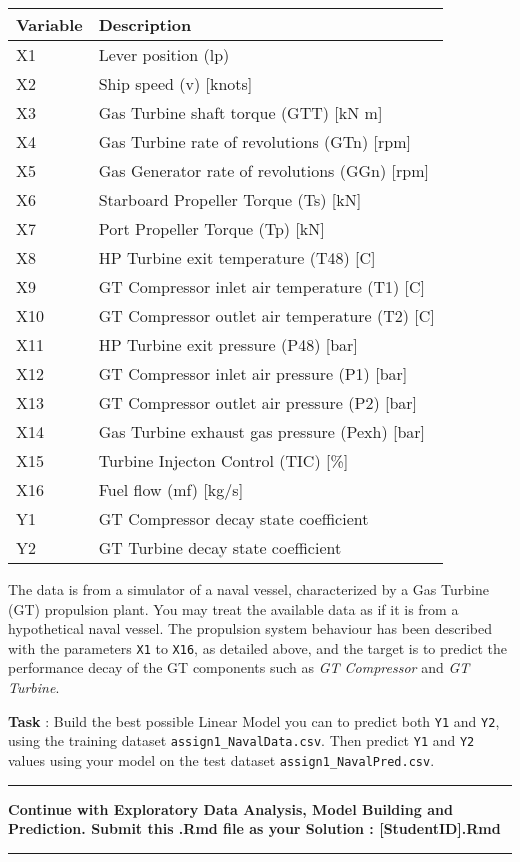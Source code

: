 \documentclass[
]{article}
\begin{document}
\begin{longtable}[]{@{}ll@{}}
\toprule
Variable & Description\tabularnewline
\midrule
\endhead
X1 & Lever position (lp)\tabularnewline
X2 & Ship speed (v) {[}knots{]}\tabularnewline
X3 & Gas Turbine shaft torque (GTT) {[}kN m{]}\tabularnewline
X4 & Gas Turbine rate of revolutions (GTn) {[}rpm{]}\tabularnewline
X5 & Gas Generator rate of revolutions (GGn) {[}rpm{]}\tabularnewline
X6 & Starboard Propeller Torque (Ts) {[}kN{]}\tabularnewline
X7 & Port Propeller Torque (Tp) {[}kN{]}\tabularnewline
X8 & HP Turbine exit temperature (T48) {[}C{]}\tabularnewline
X9 & GT Compressor inlet air temperature (T1) {[}C{]}\tabularnewline
X10 & GT Compressor outlet air temperature (T2) {[}C{]}\tabularnewline
X11 & HP Turbine exit pressure (P48) {[}bar{]}\tabularnewline
X12 & GT Compressor inlet air pressure (P1) {[}bar{]}\tabularnewline
X13 & GT Compressor outlet air pressure (P2) {[}bar{]}\tabularnewline
X14 & Gas Turbine exhaust gas pressure (Pexh) {[}bar{]}\tabularnewline
X15 & Turbine Injecton Control (TIC) {[}\%{]}\tabularnewline
X16 & Fuel flow (mf) {[}kg/s{]}\tabularnewline
Y1 & GT Compressor decay state coefficient\tabularnewline
Y2 & GT Turbine decay state coefficient\tabularnewline
\bottomrule
\end{longtable}

The data is from a simulator of a naval vessel, characterized by a Gas
Turbine (GT) propulsion plant. You may treat the available data as if it
is from a hypothetical naval vessel. The propulsion system behaviour has
been described with the parameters \texttt{X1} to \texttt{X16}, as
detailed above, and the target is to predict the performance decay of
the GT components such as \emph{GT Compressor} and \emph{GT Turbine}.

\textbf{Task} : Build the best possible Linear Model you can to predict
both \texttt{Y1} and \texttt{Y2}, using the training dataset
\texttt{assign1\_NavalData.csv}. Then predict \texttt{Y1} and
\texttt{Y2} values using your model on the test dataset
\texttt{assign1\_NavalPred.csv}.

\begin{center}\rule{0.5\linewidth}{0.5pt}\end{center}

\textbf{Continue with Exploratory Data Analysis, Model Building and
Prediction. Submit this .Rmd file as your Solution :
{[}StudentID{]}.Rmd}

\begin{center}\rule{0.5\linewidth}{0.5pt}\end{center}
\end{document}
